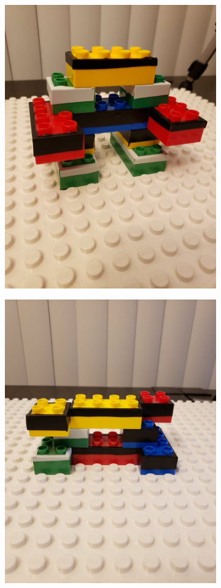 \begin{figure}[H]
    \begin{subfigure}{0.5\textwidth}
       \centering
       \includegraphics[width=0.8\linewidth,trim={0 25cm 0 5cm},clip]{figures/t1.jpg}
       
       \caption[{}]{\label{fig:fig_3-6a}}
    \end{subfigure}
    \begin{subfigure}{0.5\textwidth}
       \centering
       \includegraphics[width=0.8\linewidth,trim={0 20cm 0 10cm},clip]{figures/t2.jpg}
       

\end{subfigure}
\end{figure}
